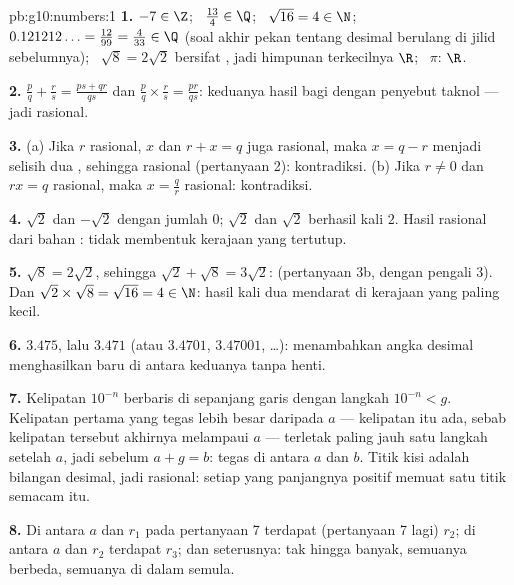 \begin{solution}{pb:g10:numbers:1}
\textbf{1.} $-7 \in \Z$; \ $\frac{13}{4} \in \Q$; \
$\sqrt{16} = 4 \in \N$; \ $0.121212\ldots = \frac{12}{99} =
\frac{4}{33} \in \Q$ (soal akhir pekan tentang desimal berulang di jilid
sebelumnya); \ $\sqrt8 = 2\sqrt2$ bersifat , jadi himpunan
terkecilnya $\R$; \ $\pi$: $\R$.

\textbf{2.} $\frac pq + \frac rs = \frac{ps + qr}{qs}$ dan
$\frac pq \times \frac rs = \frac{pr}{qs}$: keduanya hasil bagi
 dengan penyebut taknol --- jadi rasional.

\textbf{3.} (a) Jika $r$ rasional, $x$  dan
$r + x = q$ juga rasional, maka $x = q - r$ menjadi
selisih dua , sehingga rasional (pertanyaan 2):
kontradiksi. (b) Jika $r \neq 0$ dan $r x = q$ rasional, maka
$x = \frac qr$ rasional: kontradiksi.

\textbf{4.} $\sqrt2$ dan $-\sqrt2$  dengan jumlah $0$;
$\sqrt2$ dan $\sqrt2$ berhasil kali $2$. Hasil rasional dari
bahan :  tidak membentuk kerajaan
yang tertutup.

\textbf{5.} $\sqrt8 = 2\sqrt2$, sehingga
$\sqrt2 + \sqrt8 = 3\sqrt2$:  (pertanyaan 3b, dengan pengali
$3$). Dan $\sqrt2 \times \sqrt8 = \sqrt{16} = 4 \in \N$: hasil
kali dua  mendarat di kerajaan yang paling
kecil.

\textbf{6.} $3.475$, lalu $3.471$ (atau $3.4701$, $3.47001$,
\dots): menambahkan angka desimal menghasilkan 
baru di antara keduanya tanpa henti.

\textbf{7.} Kelipatan $10^{-n}$ berbaris di sepanjang garis dengan
langkah $10^{-n} < g$. Kelipatan pertama yang tegas lebih besar
daripada $a$ --- kelipatan itu ada, sebab kelipatan tersebut akhirnya
melampaui $a$ --- terletak paling jauh satu langkah setelah $a$, jadi
sebelum $a + g = b$: tegas di antara $a$ dan $b$. Titik kisi adalah
bilangan desimal, jadi rasional: setiap  yang panjangnya positif
memuat satu titik semacam itu.

\textbf{8.} Di antara $a$ dan  $r_1$ pada
pertanyaan 7 terdapat (pertanyaan 7 lagi)  $r_2$; di antara
$a$ dan $r_2$ terdapat \omterm{def:g10:numbers:sets}{bilangan rasional} $r_3$; dan seterusnya: tak hingga
banyak, semuanya berbeda, semuanya di dalam \omterm{def:g10:numbers:interval}{interval} semula.


\end{solution}
